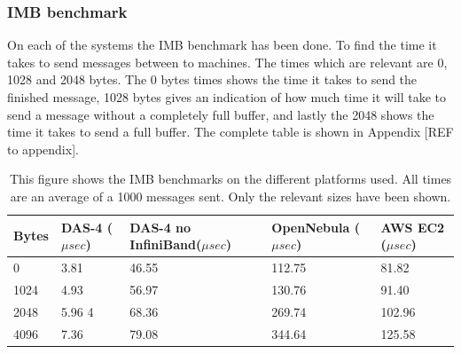 \subsubsection{IMB benchmark}
On each of the systems the IMB benchmark has been done. To find the time it takes to send messages between to machines. The times which are relevant are 0, 1028 and 2048 bytes. The 0 bytes times shows the time it takes to send the finished message, 1028 bytes gives an indication of how much time it will take to send a message without a completely full buffer, and lastly the 2048 shows the time it takes to send a full buffer. The complete table is shown in Appendix [REF to appendix].
\begin{table}[!h]
\begin{tabular}{|l|l|l|l|l|}
\hline
Bytes & DAS-4 ($\mu sec$) & DAS-4 no InfiniBand($\mu sec$) & OpenNebula ($\mu sec$) & AWS EC2 ($\mu sec$)\\ \hline
0 & 3.81 &  46.55  & 112.75 &   81.82 \\ \hline
1024 & 4.93 & 56.97  &  130.76 &  91.40  \\ \hline 
2048 & 5.96 4 & 68.36 & 269.74 &  102.96 \\ \hline
4096 & 7.36 & 79.08  & 344.64 &  125.58  \\ \hline 
\end{tabular}
\caption{This figure shows the IMB benchmarks on the different platforms used. All times are an average of a 1000 messages sent. Only the relevant sizes have been shown.}
\label{tab:imb_bench}
\end{table}

